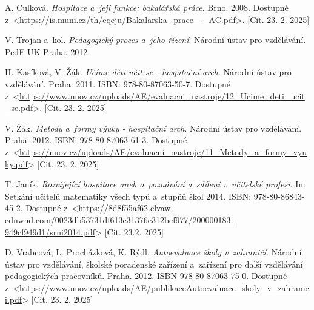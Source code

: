 \newpage


\raggedright
\sloppy

\begin{thebibliography}{99}

 A. Culková. \emph{Hospitace a~její funkce: bakalářská práce}. Brno. 2008. Dostupné z~<\url{https://is.muni.cz/th/eqeju/Bakalarska_prace_-_AC.pdf}>. [Cit. 23. 2. 2025]

 V. Trojan a~kol. \emph{Pedagogický proces a~jeho řízení}. Národní ústav pro vzdělávání. PedF UK Praha. 2012. 

 H. Kasíková, V. Žák. \emph{Učíme děti učit se - hospitační arch}. Národní ústav pro vzdělávání. Praha. 2011. ISBN: 978-80-87063-50-7. Dostupné z~<\url{https://www.nuov.cz/uploads/AE/evaluacni_nastroje/12_Ucime_deti_ucit_se.pdf}>. [Cit. 23. 2. 2025]

 V. Žák. \emph{Metody a~formy výuky - hospitační arch}. Národní ústav pro vzdělávání. Praha. 2012. ISBN: 978-80-87063-61-3. Dostupné z~<\url{https://nuov.cz/uploads/AE/evaluacni_nastroje/11_Metody_a_formy_vyuky.pdf}> [Cit. 23. 2. 2025]

 T. Janík. \emph{Rozvíjející hospitace aneb o~poznávání a~sdílení v~učitelské profesi}.  In: Setkání učitelů matematiky všech typů a~stupňů škol 2014. ISBN: 978-80-86843-45-2. Dostupné z~<\url{https://8d8f55af62.clvaw-cdnwnd.com/0023db53731df613e31376e312bef977/200000183-949cf949d1/srni2014.pdf}> [Cit. 23.2. 2025]

 D. Vrabcová, L. Procházková, K. Rýdl. \emph{Autoevaluace školy v~zahraničí}. Národní ústav pro vzdělávání, školské poradenské zařízení a~zařízení pro další vzdělávání pedagogických pracovníků. Praha. 2012. ISBN 978-80-87063-75-0. Dostupné z~<\url{https://www.nuov.cz/uploads/AE/publikaceAutoevaluace_skoly_v_zahranici.pdf}> [Cit. 23. 2. 2025]



\end{thebibliography}
